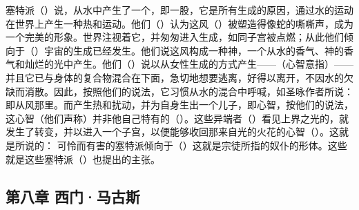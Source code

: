 塞特派（）说，从水中产生了一个，即一股，它是所有生成的原因，通过水的运动在世界上产生一种热和运动。他们（）认为这风（）被塑造得像蛇的嘶嘶声，成为一个完美的形象。世界注视着它，并匆匆进入生成，如同子宫被点燃；从此他们倾向于（）宇宙的生成已经发生。他们说这风构成一种神，一个从水的香气、神的香气和灿烂的光中产生。他们（）说以从女性生成的方式产生——（心智意指）——并且它已与身体的复合物混合在下面，急切地想要逃离，好得以离开，不因水的欠缺而消散。因此，按照他们的说法，它习惯从水的混合中呼喊，如圣咏作者所说： 即从风那里。而产生热和扰动，并为自身生出一个儿子，即心智，按他们的说法，这心智（他们声称）并非他自己特有的（）。这些异端者（）看见上界之光的，就发生了转变，并以进入一个子宫，以便能够收回那来自光的火花的心智（）。这就是所说的：  可怜而有害的塞特派倾向于（）这就是宗徒所指的奴仆的形体。这些就是这些塞特派（）也提出的主张。\par


\subsection{第八章 西门·马古斯}

